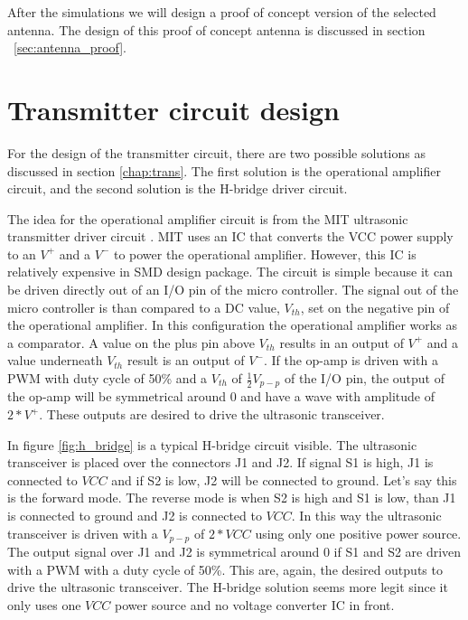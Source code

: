 After the simulations we will design a proof of concept version of the selected antenna.
The design of this proof of concept antenna is discussed in section ~\ref{sec:antenna_proof}.

\section{Transmitter circuit design}
\label{sec:transcircuit}

For the design of the transmitter circuit, there are two possible solutions as discussed in section \ref{chap:trans}. The first solution is the operational amplifier circuit, and the second solution is the H-bridge driver circuit.

The idea for the operational amplifier circuit is from the MIT ultrasonic transmitter driver circuit \cite{Priyantha2005}. MIT uses an IC that converts the VCC power supply to an $V^{+}$ and a $V^{-}$ to power the operational amplifier. However, this IC is relatively expensive in SMD design package. The circuit is simple because it can be driven directly out of an I/O pin of the micro controller. The signal out of the micro controller is than compared to a DC value, $V_{th}$, set on the negative pin of the operational amplifier. In this configuration the operational amplifier works as a comparator. A value on the plus pin above $V_{th}$ results in an output of $V^{+}$ and a value underneath $V_{th}$ result is an output of $V^{-}$. If the op-amp is driven with a PWM with duty cycle of 50\% and a $V_{th}$ of $\frac{1}{2}V_{p-p}$ of the I/O pin, the output of the op-amp will be symmetrical around 0 and have a wave with amplitude of $2 * V^{+}$. These outputs are desired to drive the ultrasonic transceiver.

In figure \ref{fig:h_bridge} is a typical H-bridge circuit visible. The ultrasonic transceiver is placed over the connectors J1 and J2. If signal S1 is high, J1 is connected to $VCC$ and if S2 is low, J2 will be connected to ground. Let's say this is the forward mode. The reverse mode is when S2 is high and S1 is low, than J1 is connected to ground and J2 is connected to $VCC$. In this way the ultrasonic transceiver is driven with a $V_{p-p}$ of $2 * VCC$ using only one positive power source. The output signal over J1 and J2 is symmetrical around 0 if S1 and S2 are driven with a PWM with a duty cycle of 50\%. This are, again, the desired outputs to drive the ultrasonic transceiver. The H-bridge solution seems more legit since it only uses one $VCC$ power source and no voltage converter IC in front.

